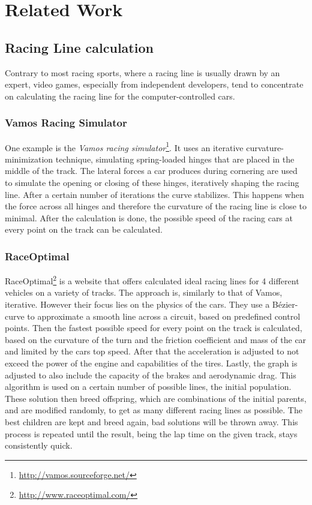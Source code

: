 \section{Related Work}
\label{sec:related_work}

\subsection{Racing Line calculation}
Contrary to most racing sports, where a racing line is usually drawn by an expert, video games, especially from independent developers, tend to concentrate on calculating the racing line for the computer-controlled cars.

\subsubsection{Vamos Racing Simulator}
One example is the \textit{Vamos racing simulator}\footnote{\url{http://vamos.sourceforge.net/}}. It uses an iterative cur\-va\-ture-min\-i\-mi\-za\-tion technique, simulating spring-loaded hinges that are placed in the middle of the track. The lateral forces a car produces during cornering are used to simulate the opening or closing of these hinges, iteratively shaping the racing line. After a certain number of iterations the curve stabilizes. This happens when the force across all hinges and therefore the curvature of the racing line is close to minimal. After the calculation is done, the possible speed of the racing cars at every point on the track can be calculated. 

\subsubsection{RaceOptimal}
RaceOptimal\footnote{\url{http://www.raceoptimal.com/}} is a website that offers calculated ideal racing lines for 4 different vehicles on a variety of tracks. The approach is, similarly to that of Vamos, iterative. However their focus lies on the physics of the cars. They use a Bézier-curve to approximate a smooth line across a circuit, based on predefined control points. Then the fastest possible speed for every point on the track is calculated, based on the curvature of the turn and the friction coefficient and mass of the car and limited by the cars top speed. After that the acceleration is adjusted to not exceed the power of the engine and capabilities of the tires. Lastly, the graph is adjusted to also include the capacity of the brakes and aerodynamic drag. 
This algorithm is used on a certain number of possible lines, the initial population. These solution then breed offspring, which are combinations of the initial parents, and are modified randomly, to get as many different racing lines as possible.
The best children are kept and breed again, bad solutions will be thrown away. This process is repeated until the result, being the lap time on the given track, stays consistently quick.

